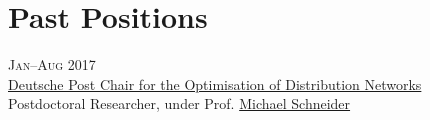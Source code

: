 \section*{Past Positions}

\begin{paracol}{2}
  \textsc{Jan--Aug 2017}
\switchcolumn
  \\
  \href{http://www.dpor.rwth-aachen.de/}{Deutsche Post Chair for the Optimisation of Distribution Networks}\\
  Postdoctoral Researcher, under Prof. \href{http://www.dpo.rwth-aachen.de/cms/DPO/Der-Lehrstuhl/Team/Lehrstuhlleitung/~nwkh/Michael-Schneider/lidx/1/}{Michael Schneider}
\end{paracol}